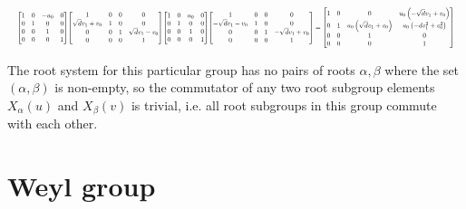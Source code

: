 \documentclass[11pt]{article}
\theoremstyle{definition}
\begin{document}
\[
\scaletoalign{\textwidth}{{\left[\begin{matrix}1 & 0 & - u_{0} & 0\\0 & 1 & 0 & 0\\0 & 0 & 1 & 0\\0 & 0 & 0 & 1\end{matrix}\right]} {\left[\begin{matrix}1 & 0 & 0 & 0\\\sqrt{d} v_{1} + v_{0} & 1 & 0 & 0\\0 & 0 & 1 & \sqrt{d} v_{1} - v_{0}\\0 & 0 & 0 & 1\end{matrix}\right]} {\left[\begin{matrix}1 & 0 & u_{0} & 0\\0 & 1 & 0 & 0\\0 & 0 & 1 & 0\\0 & 0 & 0 & 1\end{matrix}\right]} {\left[\begin{matrix}1 & 0 & 0 & 0\\- \sqrt{d} v_{1} - v_{0} & 1 & 0 & 0\\0 & 0 & 1 & - \sqrt{d} v_{1} + v_{0}\\0 & 0 & 0 & 1\end{matrix}\right]} = {\left[\begin{matrix}1 & 0 & 0 & u_{0} \left(- \sqrt{d} v_{1} + v_{0}\right)\\0 & 1 & u_{0} \left(\sqrt{d} v_{1} + v_{0}\right) & u_{0} \left(- d v_{1}^{2} + v_{0}^{2}\right)\\0 & 0 & 1 & 0\\0 & 0 & 0 & 1\end{matrix}\right]}}
\]


\else
The root system for this particular group has no pairs of roots $\alpha, \beta$ where the set $(\alpha, \beta)$ is non-empty, so the commutator of any two root subgroup elements $X_\alpha(u)$ and $X_\beta(v)$ is trivial, i.e. all root subgroups in this group commute with each other.
\fi

\newpage
\section{Weyl group}
\end{document}
